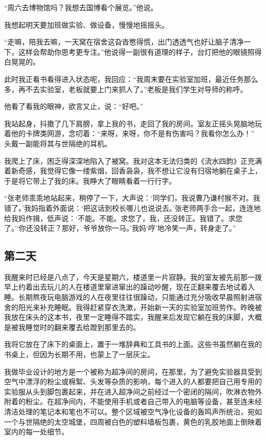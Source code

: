 \documentclass[openany,scheme = chinese, linespread = 1.5]{ctexbook}
\begin{document}
“周六去博物馆吗？我想去国博看个展览。”他说。

我想起明天要加班做实验、做设备，慢慢地摇摇头。

“走嘛，陪我去嘛，一天窝在宿舍这旮沓憋得慌，出门透透气也好让脑子清净一下，这样会帮助你思考更专注。”他说得一副很有道理的样子，台灯把他的眼镜照得白晃晃的。

此时我正看书看得进入状态呢，我回应：“我周末要在实验室加班，最近任务那么多，再不去实验室，老板就要上门来抓人了。”老板是我们学生对导师的称呼。

他看了看我的眼神，欲言又止，说：“好吧。”

我站起身，抖擞了几下肩膀，拿上我的书，走回了我的房间。室友正摇头晃脑地玩着他的卡牌类网游，念叨着：“来呀，来呀，你不是有伤害吗？我看你怎么办！” 头戴一副能将其与世隔绝的耳机。

我爬上了床，困乏得深深地陷入了被窝。我对这本无法归类的《流水四韵》正充满着新奇感，我觉得它像一缕紫烟，回香袅袅，我不想让它没有归宿地躺在桌子上，于是将它带上了我的床。我睁大了眼睛看着一行行字。

“张老师乖乖地站起来，稍停了一下，大声说：‘同学们，我说曹乃谦村猴不对。我错了。’我妈指着外面说：‘把这话到校长哪儿也说说去。’张老师两手合一起，连连地给我妈作揖，低声说：‘不能。不能。求您了，我，还没转正。我错了。求您了。’‘你还没转正？那好，爷爷放你一马。’我妈‘哼’地冷笑一声，转身走了。”

\subsection*{第二天}

我醒来时已经是八点了，今天是星期六，楼道里一片寂静。我的室友被先前那一拨早上约着出去玩儿的人在楼道里窜进窜出的躁动吵醒，现在正翻来覆去地试着入睡。长期熬夜玩电脑游戏的人在夜里往往很躁动，只能通过充分吸收早晨照射进宿舍的阳光来补充睡眠。我得赶紧穿衣洗漱，开始新一天的实验室加班劳作。昨晚被我放在床头的这本书，夜里一定睡得不踏实，我醒来后发现它躺在我的床脚，大概是被我睡觉时的翻来覆去给蹬到那里去的。

我将它放在了床下的桌面上，置于一堆辞典和工具书的上面。这些书虽然躺在我的书桌上，但因为长期不用，也蒙上了一层灰尘。

我做毕业设计的地方是一个被称为超净间的房间，在那里，为了避免实验器具受到空气中漂浮的粉尘或棉絮、头发等杂质的影响，每个进入的人都要把自己用专用的实验服从头到脚包裹起来，并在进入超净间之前经过一个密闭的隔间，吹淋衣物外附着的粉尘。在超净间内，不能使用手机或者自己带入的电脑等设备，甚至连未经清洁处理的笔记本和笔也不可以。整个区域被空气净化设备的轰鸣声所统治，宛如一个与世隔绝的太空城堡，四周被白色的塑料墙板包裹，黄色的乳胶地面上倒映着室内的每一处细节。
\end{document}
